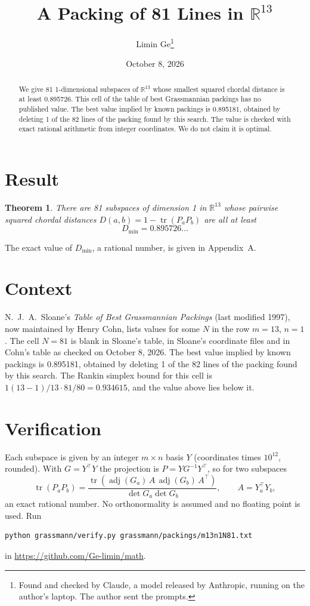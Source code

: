 \documentclass[11pt,a4paper]{article}
\title{A Packing of 81 Lines in $\mathbb{R}^{13}$}
\author{Limin Ge\thanks{Found and checked by Claude, a model released by Anthropic, running on the author's laptop. The author sent the prompts.}}
\date{October 8, 2026}
\newtheorem*{theorem}{Theorem}
\begin{document}
\maketitle
\begin{abstract}
We give 81 1-dimensional subspaces of $\mathbb{R}^{13}$ whose smallest squared chordal distance is at least 0.895726. This cell of the table of best Grassmannian packings has no published value. The best value implied by known packings is 0.895181, obtained by deleting 1 of the 82 lines of the packing found by this search. The value is checked with exact rational arithmetic from integer coordinates. We do not claim it is optimal.
\end{abstract}

\section{Result}
\begin{theorem}
There are 81 subspaces of dimension 1 in $\mathbb{R}^{13}$ whose pairwise squared chordal distances $D(a,b) = 1 - \operatorname{tr}(P_aP_b)$ are all at least
\[ D_{\min} = 0.895726\ldots \]
\end{theorem}
The exact value of $D_{\min}$, a rational number, is given in Appendix~A.


\section{Context}
N.~J.~A.~Sloane's \emph{Table of Best Grassmannian Packings} (last modified 1997), now maintained by Henry Cohn, lists values for some $N$ in the row $m=13$, $n=1$. The cell $N=81$ is blank in Sloane's table, in Sloane's coordinate files and in Cohn's table as checked on October 8, 2026. The best value implied by known packings is 0.895181, obtained by deleting 1 of the 82 lines of the packing found by this search. The Rankin simplex bound for this cell is $1(13-1)/13\cdot 81/80 = 0.934615$, and the value above lies below it.


\section{Verification}
Each subspace is given by an integer $m\times n$ basis $Y$ (coordinates times $10^{12}$, rounded). With $G=Y^\top Y$ the projection is $P=YG^{-1}Y^\top$, so for two subspaces
\[ \operatorname{tr}(P_aP_b)=\frac{\operatorname{tr}(\operatorname{adj}(G_a)\,A\,\operatorname{adj}(G_b)\,A^\top)}{\det G_a\det G_b},\qquad A=Y_a^\top Y_b, \]
an exact rational number. No orthonormality is assumed and no floating point is used. Run
\begin{verbatim}
python grassmann/verify.py grassmann/packings/m13n1N81.txt
\end{verbatim}
in \url{https://github.com/Ge-limin/math}.
\end{document}

